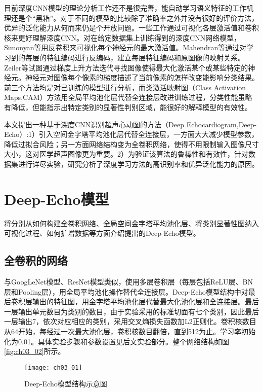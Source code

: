 目前深度CNN模型的理论分析工作还不是很完善，能自动学习语义特征的工作机理还是个“黑箱”。对于不同的模型的比较除了准确率之外并没有很好的评价方法，优异的泛化能力从何而来仍是个开放问题。一些工作\citep{simonyan14deep,Mahendran2015,Zeiler2014,Zhou2015}通过可视化各层激活值和卷积核来更好理解深度CNN。对在给定数据集上训练得到的深度CNN网络模型，Simonyan等\citep{simonyan14deep}用反卷积来可视化每个神经元的最大激活值。Mahendran等\citep{Mahendran2015}通过对学习到的每层的特征编码进行反编码，建立每层特征编码和原图像的映射关系。Zeiler等\citep{Zeiler2014}试图通过梯度上升方法迭代寻找图像使得最大化激活某个或某些特定的神经元。神经元对图像每个像素的梯度描述了当前像素的怎样改变能影响分类结果。前三个方法均是对已训练的模型进行分析，而类激活映射图（Class Activation Maps,CAM）方法\citep{Zhou2015}用全局平均池化层代替全连接层改进训练过程，分类性能虽略有降低，但能指示出特定类别的显著性判别区域，能很好的解释模型的有效性。

本文提出一种基于深度CNN识别超声心动图的方法（Deep Echocardiogram,Deep-Echo）:1）引入空间金字塔平均池化层代替全连接层，一方面大大减少模型参数，降低过拟合风险；另一方面网络结构变为全卷积网络，使得不用限制输入图像尺寸大小，这对医学超声图像更为重要。2）为验证该算法的鲁棒性和有效性，针对数据集进行详尽实验，研究分析了深度学习方法的高识别率和优异泛化能力的原因。
 
\section{Deep-Echo模型}

将分别从如何构建全卷积网络、全局空间金字塔平均池化层、将类别显著性图纳入可视化过程、如何扩增数据等方面介绍提出的Deep-Echo模型。
\subsection{全卷积的网络}

与GoogLeNet模型\citep{Szegedy2015}、ResNet模型\citep{he15}类似，使用多层卷积层（每层包括ReLU层、BN层和Pooling层），用全局平均池化操作替代全连接层。Deep-Echo模型结构中对最后卷积层输出的特征图，用金字塔平均池化层\citep{He2015spp}代替最大化池化层和全连接层。最后一层输出单元数目为类别的数目，由于实验采用的标准切面有七个类别，因此最后一层输出7，依次对应相应的类别，采用交叉熵损失函数加L2正则化。卷积核数目从64开始，每经过一次最大池化层，卷积核数目翻倍，直到512为止。学习率初始化为0.01。具体实验步骤和参数设置见后文实验部分。整个网络结构如图\ref{fig:ch03_02}所示。

\begin{figure}[!htbp]
\centering
\texttt{[image: ch03\_01]}
\caption{Deep-Echo模型结构示意图}
\label{fig:ch03_01}
\end{figure}

